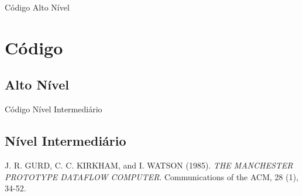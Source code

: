 \documentclass{beamer}
\begin{document}
\begin{frame}{Código Alto Nível}
	\section{Código}
	\subsection{Alto Nível}
	
\end{frame}

\begin{frame}{Código Nível Intermediário}
	\subsection{Nível Intermediário}
	
\end{frame}

\begin{frame}
	\begin{thebibliography}{1}

	J. R. GURD, C. C. KIRKHAM, and I. WATSON (1985). {\em THE MANCHESTER PROTOTYPE DATAFLOW COMPUTER}. Communications of the ACM, 28 (1), 34-52.

	\end{thebibliography}
\end{frame}
\end{document}
